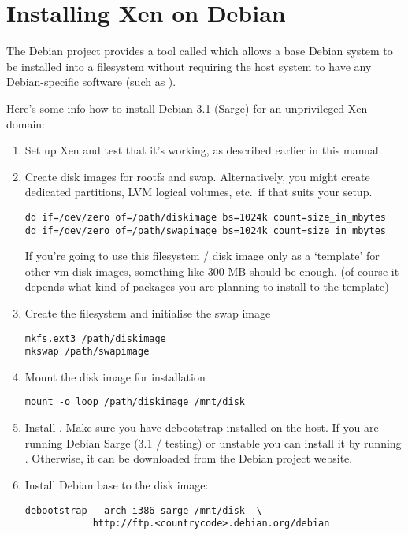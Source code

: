 \chapter{Installing Xen on Debian}

The Debian project provides a tool called  which
allows a base Debian system to be installed into a filesystem without
requiring the host system to have any Debian-specific software (such
as ).

Here's some info how to install Debian 3.1 (Sarge) for an unprivileged
Xen domain:

\begin{enumerate}

\item Set up Xen and test that it's working, as described earlier in
  this manual.

\item Create disk images for rootfs and swap. Alternatively, you might
  create dedicated partitions, LVM logical volumes, etc.\ if that
  suits your setup.
\begin{verbatim}
dd if=/dev/zero of=/path/diskimage bs=1024k count=size_in_mbytes
dd if=/dev/zero of=/path/swapimage bs=1024k count=size_in_mbytes
\end{verbatim}

  If you're going to use this filesystem / disk image only as a
  `template' for other vm disk images, something like 300 MB should be
  enough. (of course it depends what kind of packages you are planning
  to install to the template)

\item Create the filesystem and initialise the swap image
\begin{verbatim}
mkfs.ext3 /path/diskimage
mkswap /path/swapimage
\end{verbatim}

\item Mount the disk image for installation
\begin{verbatim}
mount -o loop /path/diskimage /mnt/disk
\end{verbatim}

\item Install . Make sure you have debootstrap
  installed on the host.  If you are running Debian Sarge (3.1 /
  testing) or unstable you can install it by running .  Otherwise, it can be downloaded from the
  Debian project website.

\item Install Debian base to the disk image:
\begin{verbatim}
debootstrap --arch i386 sarge /mnt/disk  \
            http://ftp.<countrycode>.debian.org/debian
\end{verbatim}


\end{enumerate}
